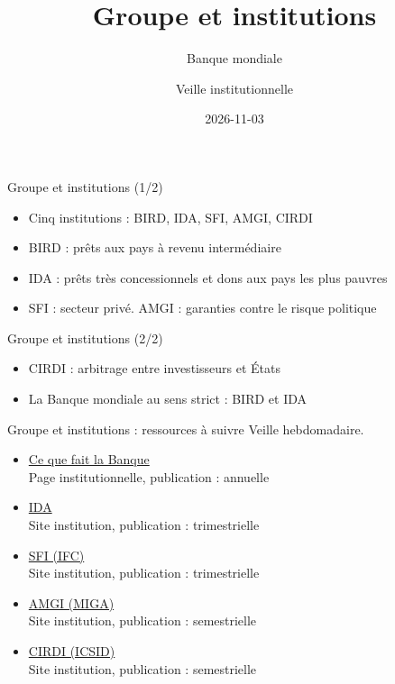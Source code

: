 \documentclass[aspectratio=169,11pt]{beamer}
\title{Groupe et institutions}
\subtitle{Banque mondiale}
\author{Veille institutionnelle}
\date{2026-11-03}
\begin{document}
\begin{frame}\titlepage\end{frame}

\begin{frame}{Groupe et institutions (1/2)}
\begin{itemize}
\item Cinq institutions : BIRD, IDA, SFI, AMGI, CIRDI
\item BIRD : prêts aux pays à revenu intermédiaire
\item IDA : prêts très concessionnels et dons aux pays les plus pauvres
\item SFI : secteur privé. AMGI : garanties contre le risque politique
\end{itemize}
\end{frame}

\begin{frame}{Groupe et institutions (2/2)}
\begin{itemize}
\item CIRDI : arbitrage entre investisseurs et États
\item La Banque mondiale au sens strict : BIRD et IDA
\end{itemize}
\end{frame}

\begin{frame}{Groupe et institutions : ressources à suivre}
\small
Veille hebdomadaire.
\begin{itemize}
\item \href{https://www.worldbank.org/en/about/what-we-do}{Ce que fait la Banque}\\{\footnotesize Page institutionnelle, publication : annuelle}
\item \href{https://ida.worldbank.org}{IDA}\\{\footnotesize Site institution, publication : trimestrielle}
\item \href{https://www.ifc.org}{SFI (IFC)}\\{\footnotesize Site institution, publication : trimestrielle}
\item \href{https://www.miga.org}{AMGI (MIGA)}\\{\footnotesize Site institution, publication : semestrielle}
\item \href{https://icsid.worldbank.org}{CIRDI (ICSID)}\\{\footnotesize Site institution, publication : semestrielle}
\end{itemize}
\end{frame}
\end{document}
